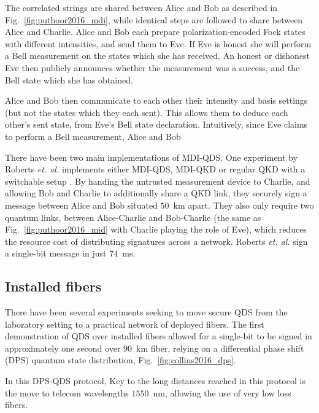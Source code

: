 The correlated strings are shared between Alice and Bob as described in Fig.~\ref{fig:puthoor2016_mdi}, while identical steps are followed to share between Alice and Charlie. Alice and Bob each prepare polarization-encoded Fock states with different intensities, and send them to Eve. If Eve is honest she will perform a Bell measurement  on the states which she has received. An honest or dishonest Eve then publicly announces whether the measurement was a success, and the Bell state which she has obtained.

Alice and Bob then communicate to each other their intensity and basis settings (but not the states which they each sent). This allows them to deduce each other's sent state, from Eve's Bell state declaration. Intuitively, since Eve claims to perform a Bell measurement, Alice and Bob 



There have been two main implementations of MDI-QDS. One experiment by Roberts \emph{et. al.} implements either MDI-QDS, MDI-QKD or regular QKD with a switchable setup \cite{Roberts2017}. By handing the untrusted measurement device to Charlie, and allowing Bob and Charlie to additionally share a QKD link, they securely sign a message between Alice and Bob situated $50$~km apart. They also only require two quantum links, between Alice-Charlie and Bob-Charlie (the same as Fig.~\ref{fig:puthoor2016_mid} with Charlie playing the role of Eve), which reduces the resource cost of distributing signatures across a network. Roberts \emph{et. al.} sign a single-bit message in just $74$~ms. 



\subsection{Installed fibers}
There have been several experiments seeking to move secure QDS from the laboratory setting to a practical network of deployed fibers. The first demonstration of QDS over installed fibers allowed for a single-bit to be signed in approximately one second over $90$~km fiber, relying on a differential phase shift (DPS) quantum state distribution, Fig.~\ref{fig:collins2016_dps}.

In this DPS-QDS protocol,  
Key to the long distances reached in this protocol is the move to telecom wavelengths $1550$~nm, allowing the use of very low loss fibers. 

